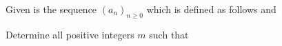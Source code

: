 Given is the sequence $(a_n)_{n\geq 0}$ which is defined as follows and 

Determine all positive integers $m$ such that 